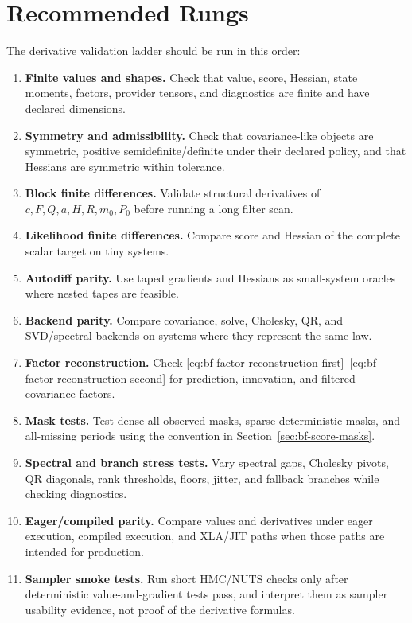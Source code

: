 \section{Recommended Rungs}
\label{sec:bf-validation-recommended-rungs}

The derivative validation ladder should be run in this order:
\begin{enumerate}[label=(\roman*)]
  \item \textbf{Finite values and shapes.}
    Check that value, score, Hessian, state moments, factors, provider tensors,
    and diagnostics are finite and have declared dimensions.
  \item \textbf{Symmetry and admissibility.}
    Check that covariance-like objects are symmetric, positive
    semidefinite/definite under their declared policy, and that Hessians are
    symmetric within tolerance.
  \item \textbf{Block finite differences.}
    Validate structural derivatives of $c,F,Q,a,H,R,m_0,P_0$ before running a
    long filter scan.
  \item \textbf{Likelihood finite differences.}
    Compare score and Hessian of the complete scalar target on tiny systems.
  \item \textbf{Autodiff parity.}
    Use taped gradients and Hessians as small-system oracles where nested tapes
    are feasible.
  \item \textbf{Backend parity.}
    Compare covariance, solve, Cholesky, QR, and SVD/spectral backends on
    systems where they represent the same law.
  \item \textbf{Factor reconstruction.}
    Check
    \eqref{eq:bf-factor-reconstruction-first}--\eqref{eq:bf-factor-reconstruction-second}
    for prediction, innovation, and filtered covariance factors.
  \item \textbf{Mask tests.}
    Test dense all-observed masks, sparse deterministic masks, and all-missing
    periods using the convention in Section~\ref{sec:bf-score-masks}.
  \item \textbf{Spectral and branch stress tests.}
    Vary spectral gaps, Cholesky pivots, QR diagonals, rank thresholds, floors,
    jitter, and fallback branches while checking diagnostics.
  \item \textbf{Eager/compiled parity.}
    Compare values and derivatives under eager execution, compiled execution,
    and XLA/JIT paths when those paths are intended for production.
  \item \textbf{Sampler smoke tests.}
    Run short HMC/NUTS checks only after deterministic value-and-gradient tests
    pass, and interpret them as sampler usability evidence, not proof of the
    derivative formulas.
\end{enumerate}

